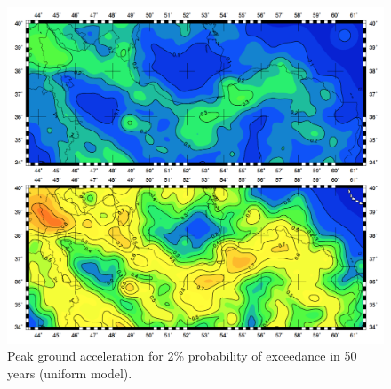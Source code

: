 \begin{figure} [!ht]
\centering
\includegraphics[scale=0.3]{figures/pdf/pga_2_mean_uniform.pdf} 
\caption{Peak ground acceleration for 2\% probability of exceedance in 50 years (uniform model).}
\label{fig:pga_2_mean_uniform}
\end{figure}

